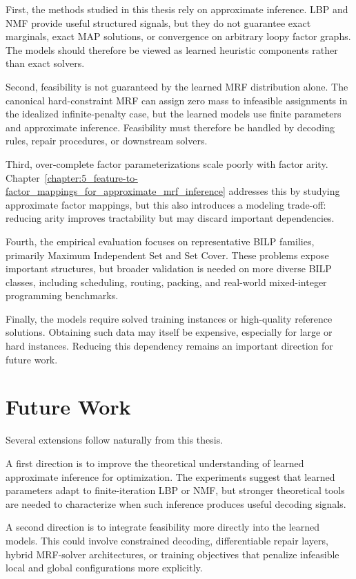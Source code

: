 First, the methods studied in this thesis rely on approximate inference. LBP and NMF provide useful structured signals, but they do not guarantee exact marginals, exact MAP solutions, or convergence on arbitrary loopy factor graphs. The models should therefore be viewed as learned heuristic components rather than exact solvers.

Second, feasibility is not guaranteed by the learned MRF distribution alone. The canonical hard-constraint MRF can assign zero mass to infeasible assignments in the idealized infinite-penalty case, but the learned models use finite parameters and approximate inference. Feasibility must therefore be handled by decoding rules, repair procedures, or downstream solvers.

Third, over-complete factor parameterizations scale poorly with factor arity. Chapter~\ref{chapter:5_feature-to-factor_mappings_for_approximate_mrf_inference} addresses this by studying approximate factor mappings, but this also introduces a modeling trade-off: reducing arity improves tractability but may discard important dependencies.

Fourth, the empirical evaluation focuses on representative BILP families, primarily Maximum Independent Set and Set Cover. These problems expose important structures, but broader validation is needed on more diverse BILP classes, including scheduling, routing, packing, and real-world mixed-integer programming benchmarks.

Finally, the models require solved training instances or high-quality reference solutions. Obtaining such data may itself be expensive, especially for large or hard instances. Reducing this dependency remains an important direction for future work.

\section{Future Work}

Several extensions follow naturally from this thesis.

A first direction is to improve the theoretical understanding of learned approximate inference for optimization. The experiments suggest that learned parameters adapt to finite-iteration LBP or NMF, but stronger theoretical tools are needed to characterize when such inference produces useful decoding signals.

A second direction is to integrate feasibility more directly into the learned models. This could involve constrained decoding, differentiable repair layers, hybrid MRF-solver architectures, or training objectives that penalize infeasible local and global configurations more explicitly.

